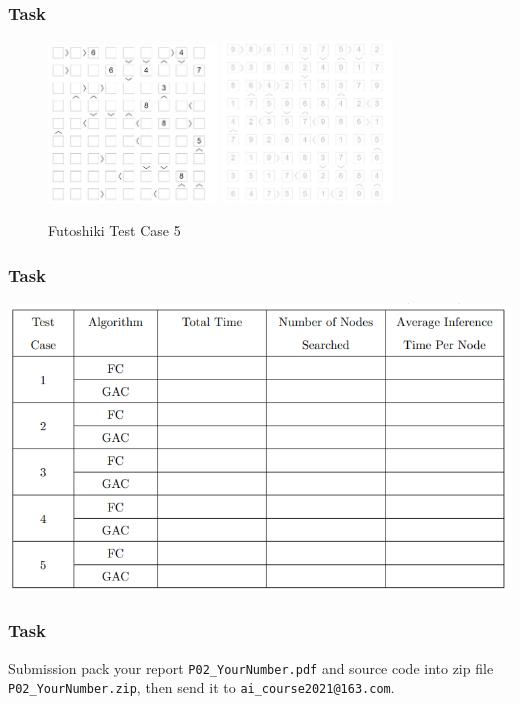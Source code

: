 \documentclass{beamer}
\begin{document}
\begin{frame}    \frametitle{Task}
        \begin{figure}[htbp]
    \centering
    \includegraphics[width=4.5cm]{Pic/f5}
    \qquad
    \includegraphics[width=4.5cm]{Pic/f5s}
    \caption{Futoshiki Test Case 5}
    \label{fig:case55}
  \end{figure}

\end{frame}

\begin{frame}    \frametitle{Task}

 \includegraphics[width=1.0\textwidth]{Pic/tab}


\end{frame}

\begin{frame} \frametitle{Task}
  \begin{block}{Submission}
    pack your report \texttt{P02\_YourNumber.pdf} and source code into zip file \texttt{P02\_YourNumber.zip}, then send it to \texttt{ai\_course2021@163.com}.
  \end{block}
\end{frame}
\end{document}
